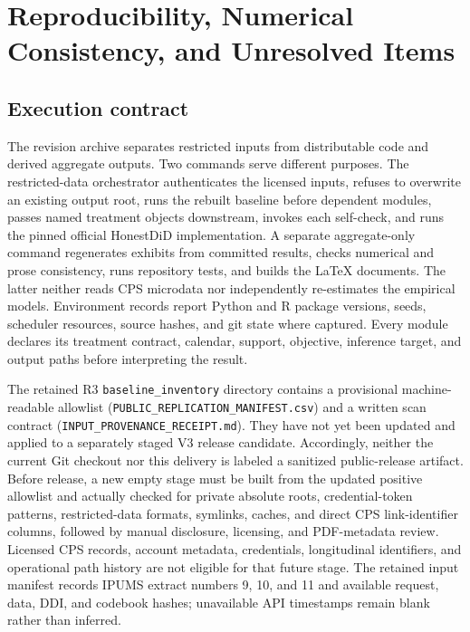 \section{Reproducibility, Numerical Consistency, and Unresolved Items}\label{app:reproducibility}

\subsection{Execution contract}

The revision archive separates restricted inputs from distributable code and derived aggregate outputs.  Two commands serve different purposes.  The restricted-data orchestrator authenticates the licensed inputs, refuses to overwrite an existing output root, runs the rebuilt baseline before dependent modules, passes named treatment objects downstream, invokes each self-check, and runs the pinned official HonestDiD implementation.  A separate aggregate-only command regenerates exhibits from committed results, checks numerical and prose consistency, runs repository tests, and builds the LaTeX{} documents.  The latter neither reads CPS microdata nor independently re-estimates the empirical models.  Environment records report Python and R package versions, seeds, scheduler resources, source hashes, and git state where captured.  Every module declares its treatment contract, calendar, support, objective, inference target, and output paths before interpreting the result.

The retained R3 \texttt{baseline\_inventory} directory contains a provisional
machine-readable allowlist (\nolinkurl{PUBLIC_REPLICATION_MANIFEST.csv}) and a
written scan contract (\nolinkurl{INPUT_PROVENANCE_RECEIPT.md}).
They have not yet been updated and applied to a separately staged V3 release
candidate.  Accordingly, neither the current Git checkout nor this delivery is
labeled a sanitized public-release artifact.  Before release, a new empty
stage must be built from the updated positive allowlist and actually checked
for private absolute roots, credential-token patterns, restricted-data
formats, symlinks, caches, and direct CPS link-identifier columns, followed by
manual disclosure, licensing, and PDF-metadata review.  Licensed CPS records,
account metadata, credentials, longitudinal identifiers, and operational path
history are not eligible for that future stage.  The retained input manifest
records IPUMS extract numbers 9, 10, and 11 and available request, data, DDI,
and codebook hashes; unavailable API timestamps remain blank rather than
inferred.


